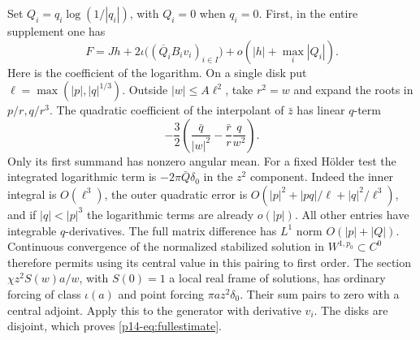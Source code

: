 Set $Q_i=q_i\log(1/|q_i|)$, with $Q_i=0$ when $q_i=0$.
First, in the entire supplement one has
\begin{equation}\label{p14-eq:fullestimate}
 F=Jh+2\iota\big((\overline Q_i B_i v_i)_{i\in I}\big)
                     +o(|h|+\max_i|Q_i|).
\end{equation}
Here is the coefficient of the logarithm. On a single disk put
$\ell=\max(|p|,|q|^{1/3})$. Outside $|w|\le A\ell^2$, take
$r^2=w$ and expand the roots in $p/r,q/r^3$. The quadratic
coefficient of the interpolant of $\bar z$ has linear $q$-term
\[
  -\frac32\left(\frac{\bar q}{|w|^2}
                   -\frac{\bar r}{r}\frac{q}{w^2}\right).
\]
Only its first summand has nonzero angular mean. For a fixed
H\"older test the integrated logarithmic term is
$-2\pi\bar Q\delta_0$ in the $z^2$ component. Indeed the inner
integral is $O(\ell^3)$, the outer quadratic error is
$O(|p|^2+|pq|/\ell+|q|^2/\ell^3)$, and if $|q|<|p|^3$ the
logarithmic terms are already $o(|p|)$. All other entries have
integrable $q$-derivatives. The full matrix difference has $L^1$
norm $O(|p|+|Q|)$. Continuous convergence of the normalized
stabilized solution in $W^{1,p_0}\subset C^0$ therefore permits
using its central value in this pairing to first order. The section
$\chi z^2 S(w)a/w$, with $S(0)=1$ a local real frame of solutions,
has ordinary forcing of class $\iota(a)$ and point forcing
$\pi a z^2\delta_0$. Their sum pairs to zero with a central
adjoint. Apply this to the generator with derivative $v_i$.
The disks are disjoint, which proves \eqref{p14-eq:fullestimate}.

